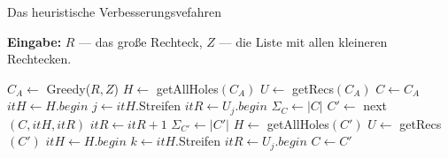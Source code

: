 \begin{algorithm}[h]
\caption{Das heuristische Verbesserungsvefahren}
\label{algo:verbesserung}
\flushleft
\textbf{Eingabe:} $R$ --- das große Rechteck, $Z$ --- die Liste mit allen kleineren Rechtecken.
\begin{algorithmic}[1]
\State $C_A \gets$ Greedy($R, Z$)
\State $H \gets$ getAllHoles$(C_A)$
\State $U \gets$ getRecs$(C_A)$
\State $C \gets C_A$
\State $itH \gets H.begin$
\State $j \gets itH.$Streifen
\State $itR \gets U_j.begin$
\label{line:abbruch}
	\State $\Sigma_C \gets |C|$ 
	\State $C' \gets$ next$(C, itH, itR)$
	\State $itR \gets itR + 1$
	\State $\Sigma_{C'} \gets |C'|$
	 \label{line:vergleich}
		\State $H \gets$ getAllHoles$(C')$
		\State $U \gets$ getRecs$(C')$
		\State $itH \gets H.begin$
		\State $k \gets itH.$Streifen
		\State $itR \gets U_j.begin$
		\State $C \gets C'$
	\EndIf
\EndWhile
\end{algorithmic}
\end{algorithm}
